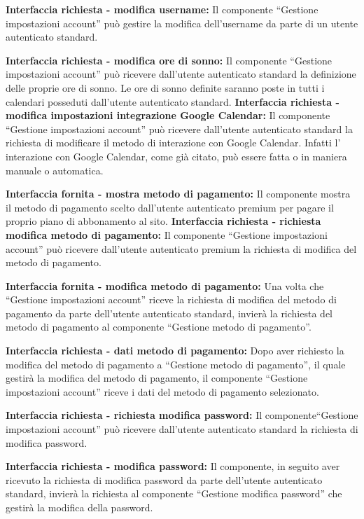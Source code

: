 \begin{listaPersonale}[DCI]{}
    \textbf{Interfaccia richiesta - modifica username:} Il componente “Gestione impostazioni account” può gestire la modifica dell'username da parte di un utente autenticato standard.

    \textbf{Interfaccia richiesta - modifica ore di sonno:} Il componente “Gestione impostazioni account” può ricevere dall'utente autenticato standard la definizione delle proprie ore di sonno. Le ore di sonno definite saranno poste in tutti i calendari posseduti dall'utente autenticato standard.
    \textbf{Interfaccia richiesta - modifica impostazioni integrazione
        Google Calendar:} Il componente “Gestione impostazioni account” può ricevere dall'utente autenticato standard la richiesta di modificare il metodo di interazione con Google Calendar. Infatti l' interazione con Google Calendar, come già citato, può essere fatta o in maniera manuale o automatica.

    \textbf{Interfaccia fornita - mostra metodo di pagamento:} Il componente mostra il metodo di pagamento scelto dall'utente autenticato premium per pagare il proprio piano di abbonamento al sito.
    \textbf{Interfaccia richiesta - richiesta modifica metodo di
        pagamento:} Il componente “Gestione impostazioni account” può ricevere dall'utente autenticato premium la richiesta di modifica del metodo di pagamento.

    \textbf{Interfaccia fornita - modifica metodo di pagamento:} Una volta che “Gestione impostazioni account” riceve la richiesta di modifica del metodo di pagamento da parte dell'utente autenticato standard, invierà la richiesta del metodo di pagamento al componente “Gestione metodo di pagamento”.

    \textbf{Interfaccia richiesta - dati metodo di pagamento:} Dopo aver richiesto la modifica del metodo di pagamento a “Gestione metodo di pagamento”, il quale gestirà la modifica del metodo di pagamento, il componente “Gestione impostazioni account” riceve i dati del metodo di pagamento selezionato.

    \textbf{Interfaccia richiesta - richiesta modifica password:} Il componente“Gestione impostazioni account” può ricevere dall'utente autenticato standard la richiesta di modifica password.

    \textbf{Interfaccia richiesta - modifica password:} Il componente, in seguito aver ricevuto la richiesta di modifica password da parte dell'utente autenticato standard, invierà la richiesta al componente “Gestione modifica password” che gestirà la modifica della password.


\end{listaPersonale}

